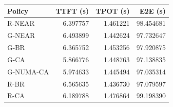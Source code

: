 \begin{tabular}{lrrr}
Policy & TTFT (s) & TPOT (s) & E2E (s) \\
\hline
R-NEAR & 6.397757 & 1.461221 & 98.454681 \\
G-NEAR & 6.493899 & 1.442624 & 97.732647 \\
G-BR & 6.365752 & 1.453256 & 97.920875 \\
G-CA & 5.866776 & 1.448763 & 97.138835 \\
G-NUMA-CA & 5.974633 & 1.445494 & 97.035314 \\
R-BR & 6.565635 & 1.436730 & 97.079597 \\
R-CA & 6.189788 & 1.476864 & 99.198390 \\
\end{tabular}
